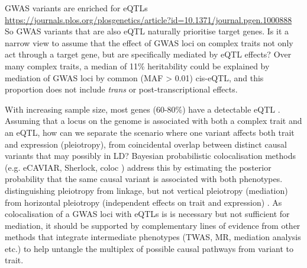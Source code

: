 \begin{outline}
\1 GWAS variants are enriched for eQTLs \url{https://journals.plos.org/plosgenetics/article?id=10.1371/journal.pgen.1000888}
    \2 So GWAS variants that are also eQTL naturally prioritise target genes.
    \2 Is it a narrow view to assume that the effect of GWAS loci on complex traits not only act through a target gene, but are specifically mediated by eQTL effects?
    \2 Over many complex traits, a median of 11\% heritability could be explained by mediation of GWAS loci by common (MAF > 0.01) cis-eQTL, 
    and this proportion does not include \textit{trans} or post-transcriptional effects.

\1 With increasing sample size, most genes (60-80\%) have a detectable eQTL \autocite{vandiedonck2017GeneticAssociationMolecular}.
Assuming that a locus on the genome is associated with both a complex trait and an \gls{eQTL},
how can we separate the scenario where one variant affects both trait and expression (pleiotropy),
from coincidental overlap between distinct causal variants that may possibly in \gls{LD}?
Bayesian probabilistic colocalisation methods (e.g. eCAVIAR, Sherlock, coloc \autocite{wallace2020ElicitingPriorsRelaxing}) 
address this by estimating the posterior probability that the same causal variant is associated with both phenotypes.
distinguishing pleiotropy from linkage, 
but not vertical pleiotropy (mediation) from horizontal pleiotropy (independent effects on trait and expression) \autocite{hemani2018EvaluatingPotentialRole}.
As colocalisation of a \gls{GWAS} loci with \glspl{eQTL} is is necessary but not sufficient for mediation, 
it should be supported by complementary lines of evidence from other methods that integrate intermediate phenotypes (TWAS, MR, mediation analysis etc.) \autocite{hemani2018EvaluatingPotentialRole}
to help untangle the multiplex of possible causal pathways from variant to trait.
%
%

\end{outline}
